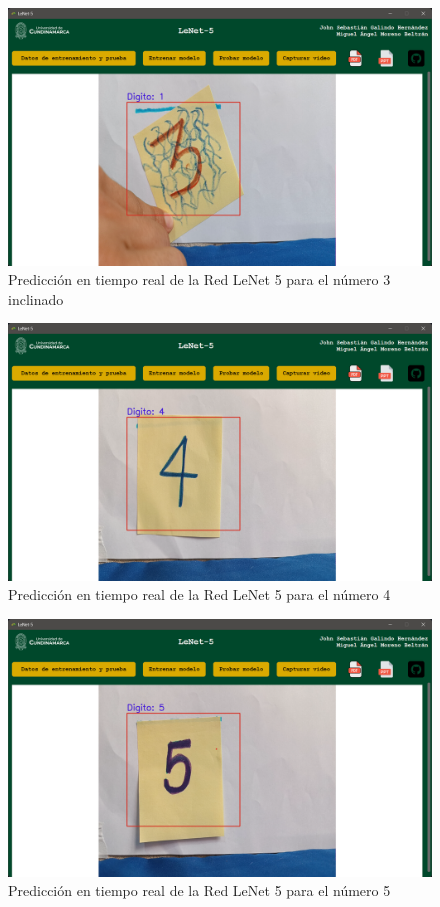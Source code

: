\begin{figure}[H]
    \centering
    \includegraphics[width=\linewidth]{src/figures/real_test_image_3-2.png}
    \caption{Predicción en tiempo real de la Red LeNet 5 para el número 3 inclinado}
    \label{fig:RealTest_3_2}
\end{figure}

\begin{figure}[H]
    \centering
    \includegraphics[width=\linewidth]{src/figures/real_test_image_4.png}
    \caption{Predicción en tiempo real de la Red LeNet 5 para el número 4}
    \label{fig:RealTest_4}
\end{figure}

\begin{figure}[H]
    \centering
    \includegraphics[width=\linewidth]{src/figures/real_test_image_5.png}
    \caption{Predicción en tiempo real de la Red LeNet 5 para el número 5}
    \label{fig:RealTest_5}
\end{figure}

